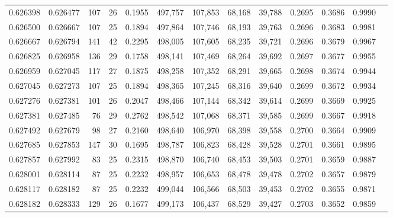 \begin{tabular}{rrrrrrrrrrrrr}
0.626398 & 0.626477 &    107 &    26 &                                     0.1955 & 497,757 & 107,853 &  68,168 &  39,788 & 0.2695 & 0.3686 & 0.9990 \\
0.626500 & 0.626667 &    107 &    25 &                                     0.1894 & 497,864 & 107,746 &  68,193 &  39,763 & 0.2696 & 0.3683 & 0.9981 \\
0.626667 & 0.626794 &    141 &    42 &                                     0.2295 & 498,005 & 107,605 &  68,235 &  39,721 & 0.2696 & 0.3679 & 0.9967 \\
0.626825 & 0.626958 &    136 &    29 &                                     0.1758 & 498,141 & 107,469 &  68,264 &  39,692 & 0.2697 & 0.3677 & 0.9955 \\
0.626959 & 0.627045 &    117 &    27 &                                     0.1875 & 498,258 & 107,352 &  68,291 &  39,665 & 0.2698 & 0.3674 & 0.9944 \\
0.627045 & 0.627273 &    107 &    25 &                                     0.1894 & 498,365 & 107,245 &  68,316 &  39,640 & 0.2699 & 0.3672 & 0.9934 \\
0.627276 & 0.627381 &    101 &    26 &                                     0.2047 & 498,466 & 107,144 &  68,342 &  39,614 & 0.2699 & 0.3669 & 0.9925 \\
0.627381 & 0.627485 &     76 &    29 &                                     0.2762 & 498,542 & 107,068 &  68,371 &  39,585 & 0.2699 & 0.3667 & 0.9918 \\
0.627492 & 0.627679 &     98 &    27 &                                     0.2160 & 498,640 & 106,970 &  68,398 &  39,558 & 0.2700 & 0.3664 & 0.9909 \\
0.627685 & 0.627853 &    147 &    30 &                                     0.1695 & 498,787 & 106,823 &  68,428 &  39,528 & 0.2701 & 0.3661 & 0.9895 \\
0.627857 & 0.627992 &     83 &    25 &                                     0.2315 & 498,870 & 106,740 &  68,453 &  39,503 & 0.2701 & 0.3659 & 0.9887 \\
0.628001 & 0.628114 &     87 &    25 &                                     0.2232 & 498,957 & 106,653 &  68,478 &  39,478 & 0.2702 & 0.3657 & 0.9879 \\
0.628117 & 0.628182 &     87 &    25 &                                     0.2232 & 499,044 & 106,566 &  68,503 &  39,453 & 0.2702 & 0.3655 & 0.9871 \\
0.628182 & 0.628333 &    129 &    26 &                                     0.1677 & 499,173 & 106,437 &  68,529 &  39,427 & 0.2703 & 0.3652 & 0.9859 \\

\end{tabular}
